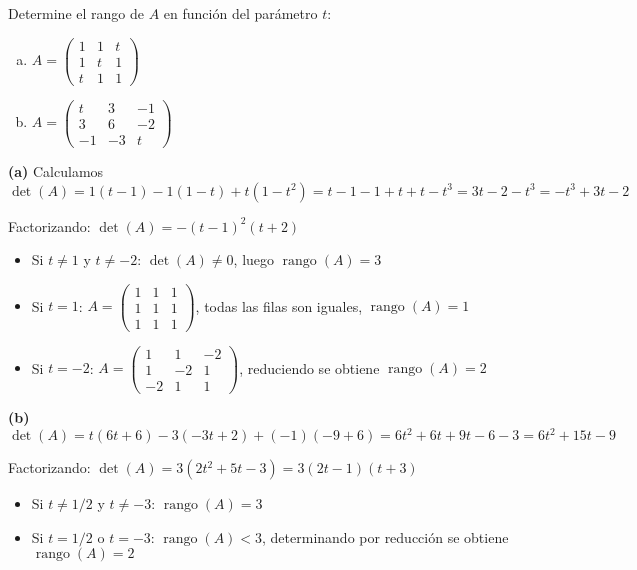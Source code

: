 \begin{prob} Determine el rango de $A$ en función del parámetro $t$:
\begin{enumerate}[(a)]
\item $A = \begin{pmatrix} 1 & 1 & t \\ 1 & t & 1 \\ t & 1 & 1 \end{pmatrix}$
\item $A = \begin{pmatrix} t & 3 & -1 \\ 3 & 6 & -2 \\ -1 & -3 & t \end{pmatrix}$
\end{enumerate}

\begin{myproof}
\textbf{(a)} Calculamos $\det(A) = 1(t-1) - 1(1-t) + t(1-t^2) = t-1-1+t+t-t^3 = 3t-2-t^3 = -t^3+3t-2$

Factorizando: $\det(A) = -(t-1)^2(t+2)$

\begin{itemize}
    \item Si $t \neq 1$ y $t \neq -2$: $\det(A) \neq 0$, luego $\operatorname{rango}(A) = 3$
    \item Si $t = 1$: $A = \begin{pmatrix} 1 & 1 & 1 \\ 1 & 1 & 1 \\ 1 & 1 & 1 \end{pmatrix}$, todas las filas son iguales, $\operatorname{rango}(A) = 1$
    \item Si $t = -2$: $A = \begin{pmatrix} 1 & 1 & -2 \\ 1 & -2 & 1 \\ -2 & 1 & 1 \end{pmatrix}$, reduciendo se obtiene $\operatorname{rango}(A) = 2$
\end{itemize}

\textbf{(b)} $\det(A) = t(6t+6) - 3(-3t+2) + (-1)(-9+6) = 6t^2+6t+9t-6-3 = 6t^2+15t-9$

Factorizando: $\det(A) = 3(2t^2+5t-3) = 3(2t-1)(t+3)$

\begin{itemize}
    \item Si $t \neq 1/2$ y $t \neq -3$: $\operatorname{rango}(A) = 3$
    \item Si $t = 1/2$ o $t = -3$: $\operatorname{rango}(A) < 3$, determinando por reducción se obtiene $\operatorname{rango}(A) = 2$
\end{itemize}
\end{myproof}
\end{prob}


